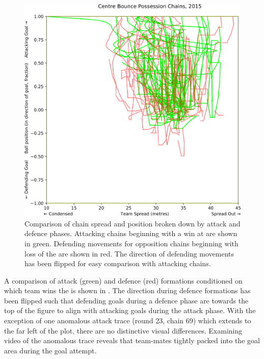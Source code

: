 \begin{figure}[!htb]
\centering
\includegraphics[width=\linewidth]{figs/paper/cb-spread-cmp-attack-and-defense.png}
\caption{Comparison of chain spread and position broken down by attack and defence phases. Attacking chains beginning with a win at \centrebounce{} are shown in green. Defending movements for opposition chains beginning with loss of the \centrebounce{} are shown in red. The direction of defending movements has been flipped for easy comparison with attacking chains.}
\label{fig:cb-spread-cmp-attack-and-defense}
\end{figure}

A comparison of attack (green) and defence (red) formations conditioned on which team wins the \centrebounce{} is shown in . The direction during defence formations has been flipped such that defending goals during a defence phase are towards the top of the figure to align with attacking goals during the attack phase. With the exception of one anomalous attack trace (round 23, chain 69) which extends to the far left of the plot, there are no distinctive visual differences. Examining video of the anomalous trace reveals that team-mates tightly packed into the goal area during the goal attempt.

